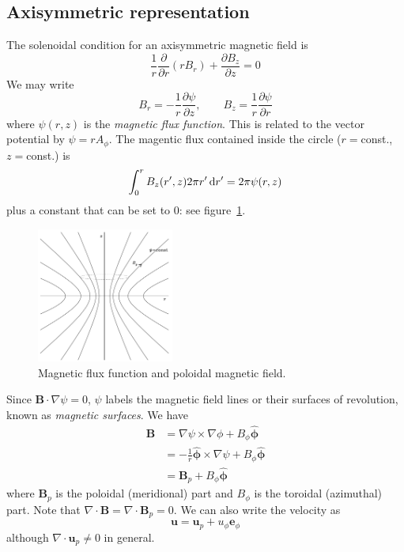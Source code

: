 \documentclass{jknotes}
\newcommand{\B}{\symbf{B}}
\renewcommand{\u}{\symbf{u}}
\begin{document}
\subsection{Axisymmetric representation}
The solenoidal condition for an axisymmetric magnetic field is
\begin{equation}
	\frac{1}{r}\frac{\partial}{\partial r}\left(rB_r\right) + \frac{\partial
	B_z}{\partial z} = 0
\end{equation}
We may write
\begin{equation}
	B_r = -\frac{1}{r}\frac{\partial \psi}{\partial z}, \hspace{2em} B_z =
	\frac{1}{r}\frac{\partial \psi}{\partial r}
\end{equation}
where $\psi(r,z)$ is the \emph{magnetic flux function}. This is related to the
vector potential by $\psi = r A_\phi$. The magentic flux contained inside the
circle ($r =$const., $z=$const.) is
\begin{equation}
	\int_0^r B_z(r',z)2\pi r' \, \diffd r' = 2\pi \psi(r,z)
\end{equation}
plus a constant that can be set to $0$: see figure~\ref{fig:axisym_B}. 

\begin{figure}[h]
	\centering
	\includegraphics[width=0.4\textwidth]{flux_function.png}
	\caption{Magnetic flux function and poloidal magnetic field.}
	\label{fig:axisym_B}
\end{figure}

Since $\B \cdot \nabla \psi = 0$, $\psi$ labels the magnetic field lines or
their surfaces of revolution, known as \emph{magnetic surfaces}. We have
\begin{align}
	\B &= \nabla \psi \times \nabla \phi + B_\phi \hat{\symbf{\phi}} \\
	   &= -\frac{1}{r} \hat{\symbf{\phi}}\times \nabla \psi + B_\phi
	   \hat{\symbf{\phi}} \\
	   &= \B_p + B_\phi \hat{\symbf{\phi}}
\end{align}
where $\B_p$ is the poloidal (meridional) part and $B_\phi$ is the toroidal
(azimuthal) part. Note that $\nabla \cdot \B = \nabla \cdot \B_p = 0$. We can
also write the velocity as
\begin{equation}
	\u = \u_p + u_\phi \symbf{e}_\phi
\end{equation}
although $\nabla \cdot \u_p \ne 0$ in general.
\end{document}
